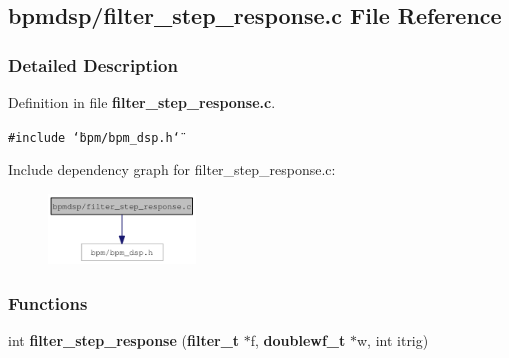 \subsection{bpmdsp/filter\_\-step\_\-response.c File Reference}
\label{filter__step__response_8c}


\subsubsection{Detailed Description}


Definition in file {\bf filter\_\-step\_\-response.c}.

{\tt \#include \char`\"{}bpm/bpm\_\-dsp.h\char`\"{}}\par


Include dependency graph for filter\_\-step\_\-response.c:\nopagebreak
\begin{figure}[H]
\begin{center}
\leavevmode
\includegraphics[width=111pt]{filter__step__response_8c__incl}
\end{center}
\end{figure}
\subsubsection*{Functions}
\begin{CompactItemize}
\item 
int {\bf filter\_\-step\_\-response} ({\bf filter\_\-t} $\ast$f, {\bf doublewf\_\-t} $\ast$w, int itrig)
\end{CompactItemize}

